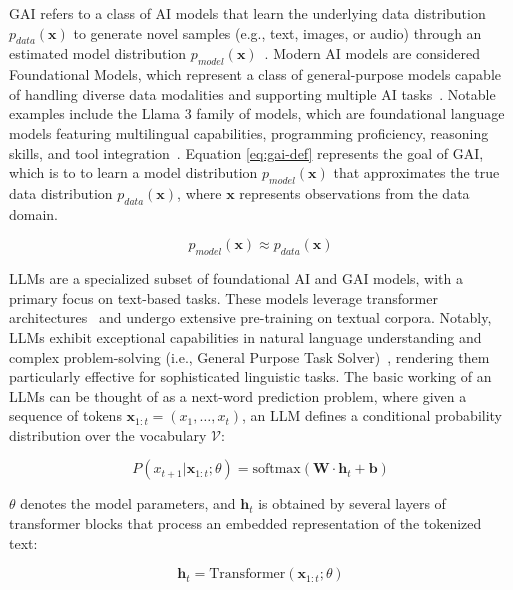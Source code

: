 \documentclass[runningheads]{llncs}
\begin{document}
\Ac{GAI} refers to a class of \ac{AI} models that learn the underlying
data distribution $p_{data}(\mathbf{x})$ to generate novel samples
(e.g., text, images, or audio) through an estimated model distribution
$p_{model}(\mathbf{x})$~\cite{foster2022generative}. Modern \ac{AI}
models are considered Foundational Models, which represent a class of
general-purpose models capable of handling diverse data modalities and
supporting multiple \ac{AI} tasks~\cite{Grattafiori2024}. Notable
examples include the Llama 3 family of models, which are foundational
language models featuring multilingual capabilities, programming
proficiency, reasoning skills, and tool
integration~\cite{Grattafiori2024}. Equation \eqref{eq:gai-def}
represents the goal of \ac{GAI}, which is to to learn a model
distribution $p_{model}(\mathbf{x})$ that approximates the true data
distribution $p_{data}(\mathbf{x})$, where $\mathbf{x}$ represents
observations from the data domain.


\begin{equation}
  \label{eq:gai-def}
  p_{model}(\mathbf{x}) \approx p_{data}(\mathbf{x})
\end{equation}


\Ac{LLMs} are a specialized subset of foundational \ac{AI} and
\ac{GAI} models, with a primary focus on text-based tasks. These
models leverage transformer
architectures~\cite{Grattafiori2024,Minaee2025} and undergo extensive
pre-training on textual corpora. Notably, \ac{LLMs} exhibit
exceptional capabilities in natural language understanding and complex
problem-solving (i.e., General Purpose Task Solver)~\cite{Zhao2023},
rendering them particularly effective for sophisticated linguistic
tasks. The basic working of an \ac{LLMs} can be thought of as a
next-word prediction problem, where given a sequence of tokens
$\mathbf{x}_{1:t} = (x_1, \ldots, x_t)$, an LLM defines a conditional
probability distribution over the vocabulary $\mathcal{V}$:

\begin{equation}
  \label{eq:llm-def}
P(x_{t+1} | \mathbf{x}_{1:t}; \theta) = \text{softmax}(\mathbf{W} \cdot \mathbf{h}_t + \mathbf{b})
\end{equation}

$\theta$ denotes the model parameters, and $\mathbf{h}_t$ is obtained
by several layers of transformer blocks that process an embedded
representation of the tokenized text:

\begin{equation}
\mathbf{h}_t = \text{Transformer}(\mathbf{x}_{1:t}; \theta)
\end{equation}
\end{document}
